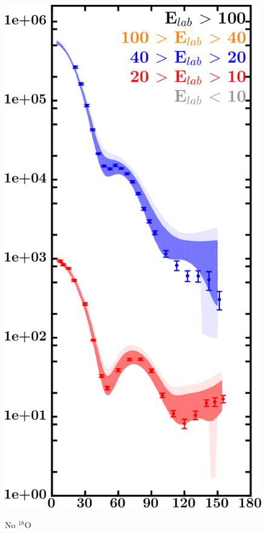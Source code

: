 \documentclass[twocolumn,secnumarabic,amssymb, nobibnotes, aps, prl,
superscriptaddress, nobalancelastpage]{revtex4}
\newcommand{\oEight}{\ensuremath{^{18}}O}
\begin{document}
\begin{figure}[!htb]
\begin{minipage}{0.4\linewidth}
\begin{minipage}[c]{0.5\linewidth}
            \includegraphics[width=\linewidth]{figures/o18_neutronElastic.png}
        \end{minipage}
        \begin{minipage}[c]{0.4\linewidth}
            \centering
            No \oEight\\

\end{minipage}
\end{minipage}
\end{figure}
\end{document}
